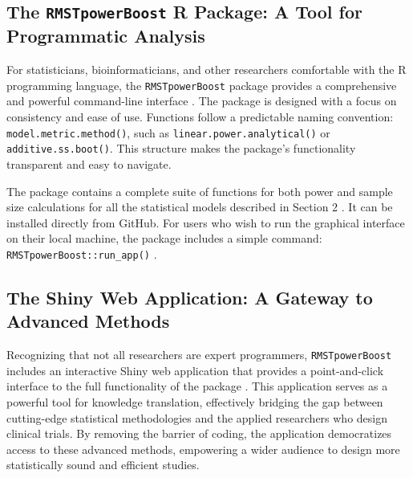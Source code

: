 \documentclass[11pt, a4paper]{article}
\begin{document}
\subsection{The \texttt{RMSTpowerBoost} R Package: A Tool for Programmatic Analysis}
For statisticians, bioinformaticians, and other researchers comfortable with the R programming language, the \texttt{RMSTpowerBoost} package provides a comprehensive and powerful command-line interface \cite{[1]}. The package is designed with a focus on consistency and ease of use. Functions follow a predictable naming convention: \texttt{model.metric.method()}, such as \texttt{linear.power.analytical()} or \texttt{additive.ss.boot()}. This structure makes the package's functionality transparent and easy to navigate.

The package contains a complete suite of functions for both power and sample size calculations for all the statistical models described in Section 2 \cite{[1]}. It can be installed directly from GitHub. For users who wish to run the graphical interface on their local machine, the package includes a simple command: \texttt{RMSTpowerBoost::run\_app()} \cite{[1, 1]}.

\subsection{The Shiny Web Application: A Gateway to Advanced Methods}
Recognizing that not all researchers are expert programmers, \texttt{RMSTpowerBoost} includes an interactive Shiny web application that provides a point-and-click interface to the full functionality of the package \cite{[1]}. This application serves as a powerful tool for knowledge translation, effectively bridging the gap between cutting-edge statistical methodologies and the applied researchers who design clinical trials. By removing the barrier of coding, the application democratizes access to these advanced methods, empowering a wider audience to design more statistically sound and efficient studies.
\end{document}
